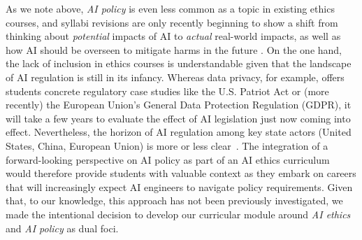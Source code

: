 As we note above, \textit{AI policy} is even less common as a topic in existing ethics courses, and syllabi revisions are only recently beginning to show a shift from thinking about \textit{potential} impacts of AI to \textit{actual} real-world impacts, as well as how AI should be overseen to mitigate harms in the future \cite{weichert_eval}. On the one hand, the lack of inclusion in ethics courses is understandable given that the landscape of AI regulation is still in its infancy. Whereas data privacy, for example, offers students concrete regulatory case studies like the U.S. Patriot Act or (more recently) the European Union's General Data Protection Regulation (GDPR), it will take a few years to evaluate the effect of AI legislation just now coming into effect. Nevertheless, the horizon of AI regulation among key state actors (United States, China, European Union) is more or less clear~\cite{schiff_whats_2020, weichert_policies}. The integration of a forward-looking perspective on AI policy as part of an AI ethics curriculum would therefore provide students with valuable context as they embark on careers that will increasingly expect AI engineers to navigate policy requirements. Given that, to our knowledge, this approach has not been previously investigated, we made the intentional decision to develop our curricular module around \textit{AI ethics} and \textit{AI policy} as dual foci.
